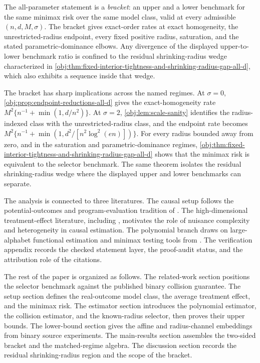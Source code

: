 The all-parameter statement is a \emph{bracket}: an upper and a lower benchmark for the same minimax risk over the same model class, valid at every admissible \((n,d,M,\sigma)\). The bracket gives exact-order rates at exact homogeneity, the unrestricted-radius endpoint, every fixed positive radius, saturation, and the stated parametric-dominance elbows. Any divergence of the displayed upper-to-lower benchmark ratio is confined to the residual shrinking-radius wedge characterized in \cref{obj:thm:fixed-interior-tightness-and-shrinking-radius-gap-all-d}, which also exhibits a sequence inside that wedge.

The bracket has sharp implications across the named regimes. At \(\sigma=0\), \cref{obj:prop:endpoint-reductions-all-d} gives the exact-homogeneity rate \(M^2\{n^{-1}+\min(1,d/n^2)\}\). At \(\sigma=2\), \cref{obj:lem:scale-sanity} identifies the radius-indexed class with the unrestricted-radius class, and the endpoint rate becomes \(M^2\{n^{-1}+\min(1,d^2/[n^2\log^2(en)])\}\). For every radius bounded away from zero, and in the saturation and parametric-dominance regimes, \cref{obj:thm:fixed-interior-tightness-and-shrinking-radius-gap-all-d} shows that the minimax risk is equivalent to the selector benchmark. The same theorem isolates the residual shrinking-radius wedge where the displayed upper and lower benchmarks can separate.

The analysis is connected to three literatures. The causal setup follows the potential-outcomes and program-evaluation tradition of \citet{Rubin1974,Rubin1979,RosenbaumRubin1983,Hahn1998,Robins1994,VanderLaan2003,Tsiatis2006,Imbens2009,ImbensRubin2015}. The high-dimensional treatment-effect literature, including \citet{Belloni2017,Chernozhukov2018,Wager2018,Nie2021,Semenova2021,Kennedy2022,Kennedy2023,Yadlowsky2022,Celentano2023,Jiang2025}, motivates the role of nuisance complexity and heterogeneity in causal estimation. The polynomial branch draws on large-alphabet functional estimation and minimax testing tools from \citet{Paninski2003,Valiant2011a,Valiant2011b,Valiant2016,Valiant2017,JiaoVenkatHanWeissman2015,WuYang2016Entropy,Wu2019,LeCam1986,Tsybakov2009,Cai2011,Donoho1990,Timan1963}. The verification appendix records the checked statement layer, the proof-audit status, and the attribution role of the citations.

The rest of the paper is organized as follows. The related-work section positions the selector benchmark against the published binary collision guarantee. The setup section defines the real-outcome model class, the average treatment effect, and the minimax risk. The estimator section introduces the polynomial estimator, the collision estimator, and the known-radius selector, then proves their upper bounds. The lower-bound section gives the affine and radius-channel embeddings from binary source experiments. The main-results section assembles the two-sided bracket and the matched-regime algebra. The discussion section records the residual shrinking-radius region and the scope of the bracket.

